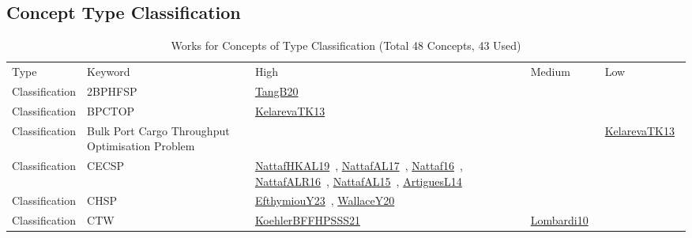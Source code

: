 \clearpage
\subsection{Concept Type Classification}
\label{sec:Classification}
\label{Classification}
{\scriptsize
\begin{longtable}{lp{3cm}>{\raggedright\arraybackslash}p{6cm}>{\raggedright\arraybackslash}p{6cm}>{\raggedright\arraybackslash}p{8cm}}
\rowcolor{white}\caption{Works for Concepts of Type Classification (Total 48 Concepts, 43 Used)}\\ \toprule
\rowcolor{white}Type & Keyword & High & Medium & Low\\ \midrule\endhead
\bottomrule
\endfoot
\index{2BPHFSP}\index{Classification!2BPHFSP}Classification & 2BPHFSP & \href{../works/TangB20.pdf}{TangB20}~\cite{TangB20} &  & \\
\index{BPCTOP}\index{Classification!BPCTOP}Classification & BPCTOP & \href{../works/KelarevaTK13.pdf}{KelarevaTK13}~\cite{KelarevaTK13} &  & \\
\index{Bulk Port Cargo Throughput Optimisation Problem}\index{Classification!Bulk Port Cargo Throughput Optimisation Problem}Classification & Bulk Port Cargo Throughput Optimisation Problem &  &  & \href{../works/KelarevaTK13.pdf}{KelarevaTK13}~\cite{KelarevaTK13}\\
\index{CECSP}\index{Classification!CECSP}Classification & CECSP & \href{../works/NattafHKAL19.pdf}{NattafHKAL19}~\cite{NattafHKAL19}, \href{../works/NattafAL17.pdf}{NattafAL17}~\cite{NattafAL17}, \href{../works/Nattaf16.pdf}{Nattaf16}~\cite{Nattaf16}, \href{../works/NattafALR16.pdf}{NattafALR16}~\cite{NattafALR16}, \href{../works/NattafAL15.pdf}{NattafAL15}~\cite{NattafAL15}, \href{../works/ArtiguesL14.pdf}{ArtiguesL14}~\cite{ArtiguesL14} &  & \\
\index{CHSP}\index{Classification!CHSP}Classification & CHSP & \href{../works/EfthymiouY23.pdf}{EfthymiouY23}~\cite{EfthymiouY23}, \href{../works/WallaceY20.pdf}{WallaceY20}~\cite{WallaceY20} &  & \\
\index{CTW}\index{Classification!CTW}Classification & CTW & \href{../works/KoehlerBFFHPSSS21.pdf}{KoehlerBFFHPSSS21}~\cite{KoehlerBFFHPSSS21} & \href{../works/Lombardi10.pdf}{Lombardi10}~\cite{Lombardi10} & \\

\end{longtable}}
